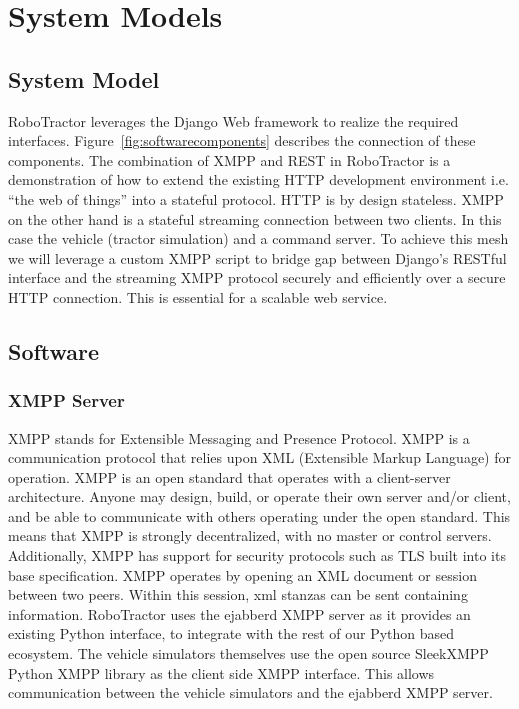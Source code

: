 \documentclass[conference,12pt]{IEEEtran}
\begin{document}
\section{System Models}

\subsection{System Model}
RoboTractor leverages the Django Web framework \autocite{_django_2014}
to realize the required interfaces. Figure~\ref{fig:softwarecomponents} describes the connection of
these components.  The combination of XMPP and REST in RoboTractor is
a demonstration of how to extend the existing HTTP development environment
i.e. ``the web of things'' into a stateful protocol. HTTP is by design
stateless. XMPP on the other hand is a stateful streaming connection between two
clients. In this case the vehicle (tractor simulation) and a command server.  To achieve this mesh we
will leverage a custom XMPP script to bridge gap between Django's RESTful
interface and the streaming XMPP protocol securely and efficiently over a secure
HTTP connection. This is essential for a scalable web service.

\subsection{Software} 

\subsubsection{XMPP Server} 

XMPP stands for Extensible
Messaging and Presence Protocol. XMPP is a communication protocol that relies
upon XML (Extensible Markup Language) for operation. XMPP is an open standard
that operates with a client-server architecture. Anyone may design, build, or
operate their own server and/or client, and be able to communicate with others
operating under the open standard. This means that XMPP is strongly
decentralized, with no master or control servers.  Additionally, XMPP has
support for security protocols such as TLS built into its base specification.
XMPP operates by opening an XML document or session between two peers. Within
this session, xml stanzas can be sent containing information.  RoboTractor uses
the ejabberd \autocite{_ejabberd} XMPP server as it provides an existing Python
interface, to integrate with the rest of our Python based ecosystem. The vehicle
simulators themselves use the open source SleekXMPP Python XMPP library as the
client side XMPP interface. This allows communication between the vehicle
simulators and the ejabberd XMPP server.  
\end{document}
